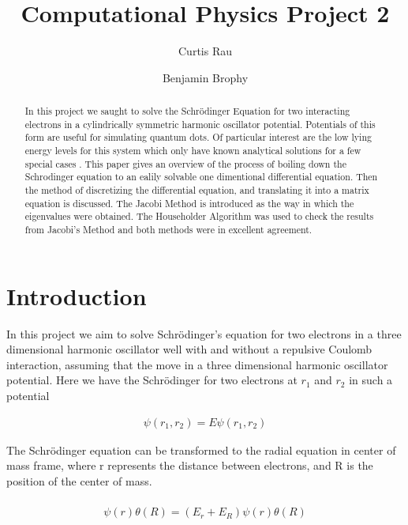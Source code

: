 \documentclass[twocolumn, groupedaddress]{revtex4-1}
\begin{document}
\author{Curtis Rau}
\author{Benjamin Brophy}
\title{Computational Physics Project 2}

\begin{abstract}
In this project we saught to solve the Schr\"{o}dinger Equation for two interacting electrons in a cylindrically symmetric harmonic oscillator potential.  Potentials of this form are useful for simulating quantum dots.  Of particular interest are the low lying energy levels for this system which only have known analytical solutions for a few special cases \cite{taut}.  This paper gives an overview of the process of boiling down the Schrodinger equation to an ealily solvable one dimentional differential equation.  Then the method of discretizing the differential equation, and translating it into a matrix equation is discussed.  The Jacobi Method is introduced as the way in which the eigenvalues were obtained.  The Householder Algorithm was used to check the results from Jacobi's Method and both methods were in excellent agreement.
\end{abstract}

\maketitle


\section{Introduction}
In this project we aim to solve Schr\"{o}dinger's equation for two electrons in a three dimensional harmonic oscillator well with and without a repulsive Coulomb interaction, assuming that the move in a three dimensional harmonic oscillator potential. Here we have the Schr\"odinger for two electrons at $r_1$ and $r_2$ in such a potential

\begin{align}
[- \frac{\hbar^2}{2m} \left( \nabla_1^2 + \nabla_2^2 \right)				\nonumber
		+ \frac{1}{2}m\omega^2 \left( r_1^2 + r_2^2 \right)				\\
		+ \frac{ke^2}{|r_1^2-r_2^2|}
		]
		\psi (r_1,r_2)  = E \psi (r_1,r_2)
\end{align}


The Schr\"{o}dinger equation can be transformed to the radial equation in center of mass frame, where r represents the distance between electrons, and R is the position of the center of mass.

\begin{align}
  [ \left( - \frac{\hbar^2}{m} \frac{1}{r^2} \partial_r r^2 \partial_r + \frac{1}{4} m \omega^2 r^2 + \frac{k e^2}{r} \right) 	\nonumber \\
+ \left( - \frac{\hbar^2}{4m} \frac{1}{R^2} \partial_R R^2 \partial_R + m\omega^2 R^2 + \frac{\hbar l(l+1)}{R^2} \right) ]		\nonumber \\
 \psi (r) \theta (R) = (E_r + E_R) \psi (r) \theta (R)
\end{align}
\end{document}
